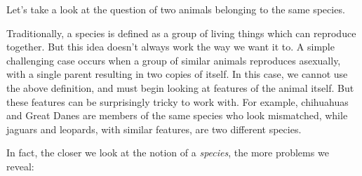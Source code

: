 \documentclass[9pt, twoside]{book}
\theoremstyle{argtstyle}
\begin{document}
Let's take a look at the question of two animals belonging to the
same species.

Traditionally, a species is defined as a group of living things
which can reproduce together. But this idea doesn't always work the way we want
it to. A simple challenging case occurs when a group of similar animals
reproduces asexually, with a single parent resulting in two copies of itself. In
this case, we cannot use the above definition, and must begin looking at
features of the animal itself. But these features can be surprisingly
tricky to work with. For example, chihuahuas and Great Danes are members of the same
species who look mismatched, while jaguars and leopards, with similar
features, are two different species.

In fact, the closer we look at the notion of a {\em species}, the more problems
we reveal:
\end{document}
